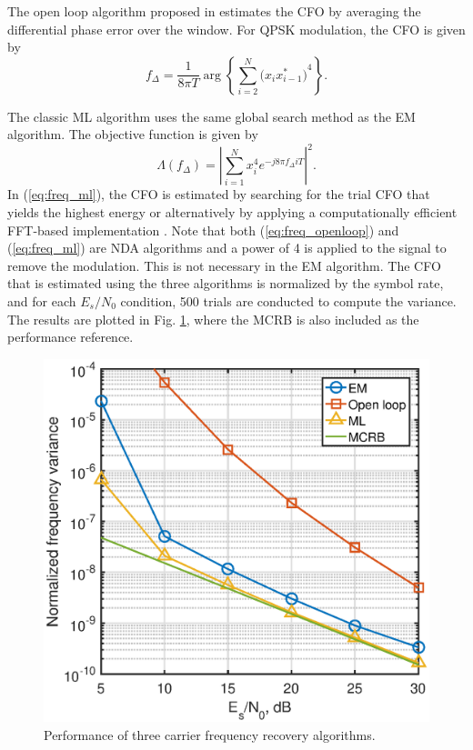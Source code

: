 \documentclass[journal,comsoc, onecolumn, 12pt,draftclsnofoot]{IEEEtran} %
\begin{document}
The open loop algorithm proposed in \cite{Chuang1991} estimates the CFO  by averaging the differential phase error over the window.
For QPSK modulation, the CFO is given by \cite{mengali1997synchronization}
\begin{equation}
f_\Delta = \frac{1}{8 \pi T} \arg \left\{ {\sum\limits_{i = 2}^{{N} } {{{\big( {x_i x^*_{i-1}} \big)}^4}} } \right\}.
\label{eq:freq_openloop}
\end{equation}

The classic ML algorithm uses the same global search method as the EM algorithm.
The objective function is given by 
\begin{equation}
\Lambda (f_\Delta)=\left| \sum\limits_{i = 1}^N {{{ {{x^4_i}e^{-j8\pi f_\Delta i T}}}}} \right|^2. 
\label{eq:freq_ml}
\end{equation}
In (\ref{eq:freq_ml}), the CFO is estimated by searching for the trial CFO that yields the highest energy or alternatively by applying a computationally efficient FFT-based implementation \cite{Wang2004}.
Note that both (\ref{eq:freq_openloop}) and (\ref{eq:freq_ml}) are NDA algorithms and a power of 4 is applied to the signal to remove the modulation.
This is not necessary in the EM algorithm.
The CFO that is estimated using the three algorithms is normalized by the symbol rate,
and for each \(E_s/N_0\) condition, 500 trials are conducted to compute the variance.
The results are plotted in Fig. \ref{fig:per_freq}, where the MCRB is also included as the performance reference.

\begin{figure}[ht]
\centering
\includegraphics[width=3 in]{pic/per_freq.eps}
\caption{Performance of three carrier frequency recovery algorithms.}
\label{fig:per_freq} 
\end{figure} 
\end{document}
